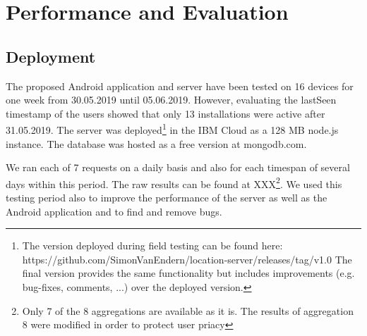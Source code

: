 \chapter{Performance and Evaluation}\label{chapter:performance}
\section{Deployment}
The proposed Android application and server have been tested on 16 devices for one week from 30.05.2019 until 05.06.2019. However, evaluating the lastSeen timestamp of the users showed that only 13 installations were active after 31.05.2019. The server was deployed\footnote{The version deployed during field testing can be found here: https://github.com/SimonVanEndern/location-server/releases/tag/v1.0 The final version provides the same functionality but includes improvements (e.g. bug-fixes, comments, ...) over the deployed version.} in the IBM Cloud as a 128 MB node.js instance. The database was hosted as a free version at mongodb.com.

We ran each of 7 requests on a daily basis and also for each timespan of several days within this period. The raw results can be found at XXX\footnote{Only 7 of the 8 aggregations are available as it is. The results of aggregation 8 were modified in order to protect user priacy}. We used this testing period also to improve the performance of the server as well as the Android application and to find and remove bugs.

